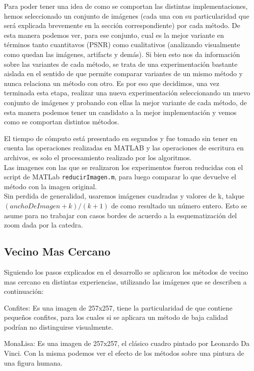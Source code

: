 \documentclass[a4paper]{article}
\begin{document}
Para poder tener una idea de como se comportan las distintas implementaciones, hemos seleccionado un conjunto de imágenes (cada una con su particularidad que será explicada brevemente en la sección correspondiente) por cada método. De esta manera podemos ver, para ese conjunto, cual es la mejor variante en términos tanto cuantitavos (PSNR) como cualitativos (analizando visualmente como quedan las imágenes, artifacts y demás). Si bien esto nos da información sobre las variantes de cada método, se trata de una experimentación bastante aislada en el sentido de que permite comparar variantes de un mismo método y nunca relaciona un método con otro. Es por eso que decidimos, una vez terminada esta etapa, realizar una nueva experimentación seleccionando un nuevo conjunto de imágenes y probando con ellas la mejor variante de cada método, de esta manera podemos tener un candidato a la mejor implementación y vemos como se comportan distintos métodos.
\par El tiempo de cómputo está presentado en segundos y fue tomado sin tener en cuenta las operaciones realizadas en MATLAB y las operaciones de escritura en archivos, es solo el procesamiento realizado por los algoritmos.\\
Las imagenes con las que se realizaron los experimentos fueron reducidas con el script de MATLab \texttt{reducirImagen.m}, para luego comparar lo que devuelve el m\'etodo con la imagen original.\\
 Sin perdida de generalidad, usaremos im\'agenes cuadradas y valores de k,  talque $(anchoDeImagen + k) / (k + 1)$ de como resultado un n\'umero entero. Esto se asume para no trabajar con casos bordes de acuerdo a la esquematizaci\'on del zoom dada por la catedra.


\subsection{Vecino Mas Cercano}

Siguiendo los pasos explicados en el desarrollo se aplicaron los métodos de vecino mas cercano en distintas experiencias, utilizando las imágenes que se describen a continuación:

Confites: Es una imagen de 257x257, tiene la particularidad de que contiene pequeños confites, para los cuales si se aplicara un método de baja calidad podrían no distinguirse visualmente.

MonaLisa: Es una imagen de 257x257, el clásico cuadro pintado por Leonardo Da Vinci. Con la misma podemos ver el efecto de los métodos sobre una pintura de una figura humana.
\end{document}
